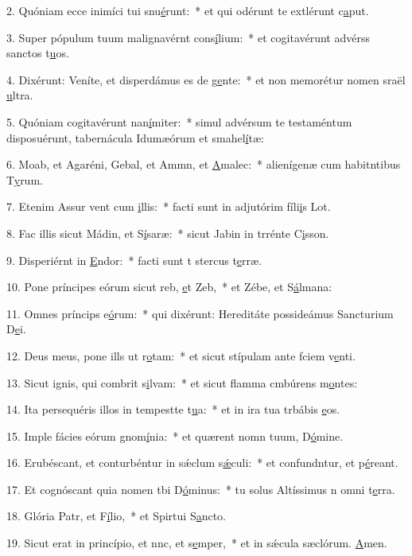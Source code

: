 2. Quóniam ecce inimíci tui snu\uline{é}runt:~* et qui odérunt te extlérunt c\uline{a}put.\par 
3. Super pópulum tuum malignavérnt cons\uline{í}lium:~* et cogitavérunt advérss sanctos t\uline{u}os.\par 
4. Dixérunt: Veníte, et disperdámus es de g\uline{e}nte:~* et non memorétur nomen sraël \uline{u}ltra.\par 
5. Quóniam cogitavérunt nan\uline{í}miter:~* simul advérsum te testaméntum disposuérunt, tabernácula Idumæórum et smahel\uline{í}tæ:\par 
6. Moab, et Agaréni, Gebal, et Ammn, et \uline{A}malec:~* alienígenæ cum habitntibus T\uline{y}rum.\par 
7. Etenim Assur vent cum \uline{i}llis:~* facti sunt in adjutórim fíli\uline{i}s Lot.\par 
8. Fac illis sicut Mádin, et S\uline{í}saræ:~* sicut Jabin in trrénte C\uline{i}sson.\par 
9. Disperiérnt in \uline{E}ndor:~* facti sunt t stercus t\uline{e}rræ.\par 
10. Pone príncipes eórum sicut reb, \uline{e}t Zeb,~* et Zébe, et S\uline{á}lmana:\par 
11. Omnes príncips e\uline{ó}rum:~* qui dixérunt: Hereditáte possideámus Sancturium D\uline{e}i.\par 
12. Deus meus, pone ills ut r\uline{o}tam:~* et sicut stípulam ante fciem v\uline{e}nti.\par 
13. Sicut ignis, qui combrit s\uline{i}lvam:~* et sicut flamma cmbúrens m\uline{o}ntes:\par 
14. Ita persequéris illos in tempestte t\uline{u}a:~* et in ira tua trbábis \uline{e}os.\par 
15. Imple fácies eórum gnom\uline{í}nia:~* et quærent nomn tuum, D\uline{ó}mine.\par 
16. Erubéscant, et conturbéntur in sǽclum s\uline{ǽ}culi:~* et confundntur, et p\uline{é}reant.\par 
17. Et cognóscant quia nomen tbi D\uline{ó}minus:~* tu solus Altíssimus n omni t\uline{e}rra.\par 
18. Glória Patr, et F\uline{í}lio,~* et Spirtui S\uline{a}ncto.\par 
19. Sicut erat in princípio, et nnc, et s\uline{e}mper,~* et in sǽcula sæclórum. \uline{A}men.\par 
